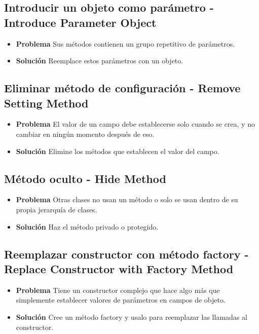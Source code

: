 \documentclass[11pt,a4paper,oneside]{book}
\begin{document}


\subsection{Introducir un objeto como parámetro - Introduce Parameter Object}
\label{introduceparameterobject}
\begin{itemize}
    \item \textbf{Problema} Sus métodos contienen un grupo repetitivo de parámetros.   
   \item \textbf{Solución} Reemplace estos parámetros con un objeto.
\end{itemize}

\subsection{Eliminar método de configuración - Remove Setting Method}
\label{removesettingmethod}
\begin{itemize}
    \item \textbf{Problema} El valor de un campo debe establecerse solo cuando se crea, y no cambiar en ningún momento después de eso.
    \item \textbf{Solución}  Elimine los métodos que establecen el valor del campo.
\end{itemize}

\subsection{Método oculto - Hide Method}
\label{hidemethod}
\begin{itemize}
    \item \textbf{Problema} Otras clases no usan un método o solo se usan dentro de su propia jerarquía de clases.
    \item \textbf{Solución} Haz el método privado o protegido.
\end{itemize} 

\subsection{Reemplazar constructor con método factory - Replace Constructor with Factory Method}
\label{replaceconstructorwithfactorymethod}
\begin{itemize}
    \item \textbf{Problema} Tiene un constructor complejo que hace algo más que simplemente establecer valores de parámetros en campos de objeto.
    \item \textbf{Solución} Cree un método factory y usalo para reemplazar las llamadas al  constructor.
\end{itemize}
    
\end{document}
